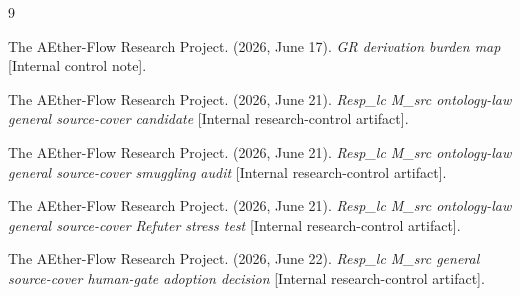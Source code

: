 \documentclass[11pt]{article}
\begin{document}
\begin{thebibliography}{9}

The AEther-Flow Research Project. (2026, June 17). \emph{GR derivation
burden map} [Internal control note].

The AEther-Flow Research Project. (2026, June 21). \emph{Resp\_lc M\_src
ontology-law general source-cover candidate}
[Internal research-control artifact].

The AEther-Flow Research Project. (2026, June 21). \emph{Resp\_lc M\_src
ontology-law general source-cover smuggling audit}
[Internal research-control artifact].

The AEther-Flow Research Project. (2026, June 21). \emph{Resp\_lc M\_src
ontology-law general source-cover Refuter stress test}
[Internal research-control artifact].

The AEther-Flow Research Project. (2026, June 22). \emph{Resp\_lc M\_src
general source-cover human-gate adoption decision}
[Internal research-control artifact].

\end{thebibliography}
\end{document}
